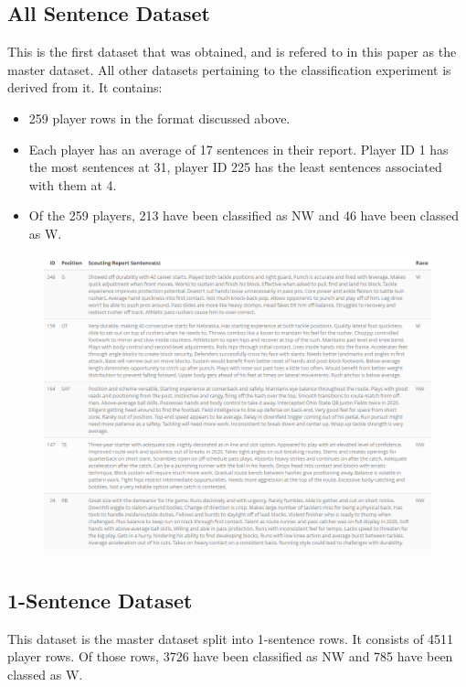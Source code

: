 \documentclass[oneside,12pt]{Classes/RoboticsLaTeX}
\begin{document}
\subsection{All Sentence Dataset}
This is the first dataset that was obtained, and is refered to in this paper as the master dataset. All other datasets pertaining to the classification experiment is derived from it. It contains:
\begin{itemize}
  \item 259 player rows in the format discussed above.
  \item Each player has an average of 17 sentences in their report. Player ID 1 has the most sentences at 31, player ID 225 has the least sentences associated with them at 4.
  \item Of the 259 players, 213 have been classified as NW and 46 have been classed as W.
\end{itemize}

\begin{figure}[hb]
  \centering
  \begin{minipage}{1\textwidth}
    \centering
    \includegraphics[width=1\linewidth]{Figures/all_sentence.png}
    \label{fig:master_dataset_sample}
  \end{minipage}%
\end{figure}

\subsection{1-Sentence Dataset}
This dataset is the master dataset split into 1-sentence rows. It consists of 4511 player rows. Of those rows, 3726 have been classified as NW and 785 have been classed as W.
\end{document}
